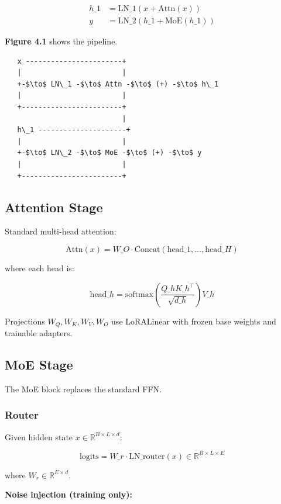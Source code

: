 \[
\begin{aligned}
h\_1 &= \text{LN}\_1(x + \text{Attn}(x)) \\
y &= \text{LN}\_2(h\_1 + \text{MoE}(h\_1))
\end{aligned}
\tag{4.1}
\]

\textbf{Figure 4.1} shows the pipeline.

\begin{lstlisting}
   x -----------------------+
   |                        |
   +-$\to$ LN\_1 -$\to$ Attn -$\to$ (+) -$\to$ h\_1
   |                        |
   +------------------------+
                            |
   h\_1 ---------------------+
   |                        |
   +-$\to$ LN\_2 -$\to$ MoE -$\to$ (+) -$\to$ y
   |                        |
   +------------------------+
\end{lstlisting}

\subsection{Attention Stage}

Standard multi-head attention:

\[
\text{Attn}(x) = W\_O \cdot \text{Concat}(\text{head}\_1, \dots, \text{head}\_H)
\tag{4.2}
\]

where each head is:

\[
\text{head}\_h = \text{softmax}\!\left(\frac{Q\_h K\_h^\top}{\sqrt{d\_h}}\right) V\_h
\tag{4.3}
\]

Projections $W_Q, W_K, W_V, W_O$ use LoRALinear with frozen base weights 
and trainable adapters.

\subsection{MoE Stage}

The MoE block replaces the standard FFN.

\subsubsection{Router}

Given hidden state $x \in \mathbb{R}^{B \times L \times d}$:

\[
\text{logits} = W\_r \cdot \text{LN}\_\text{router}(x) \in \mathbb{R}^{B \times L \times E}
\tag{4.4}
\]

where $W_r \in \mathbb{R}^{E \times d}$.

\textbf{Noise injection (training only):}

